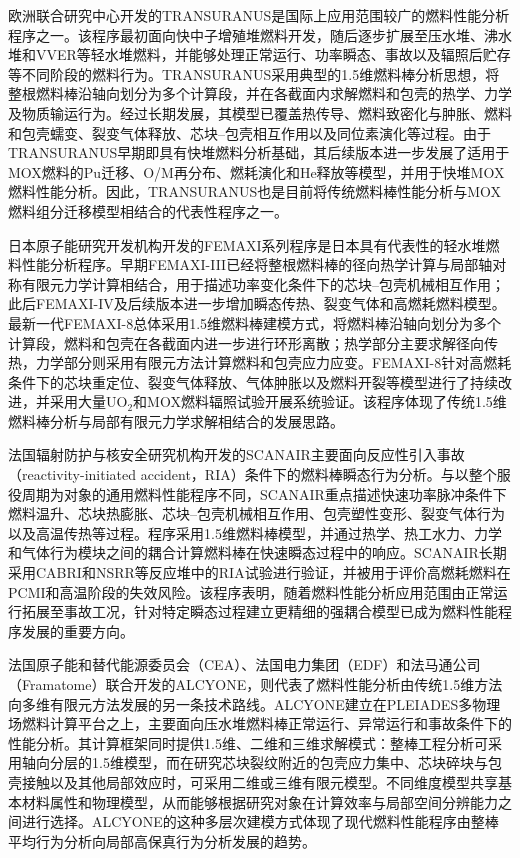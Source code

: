 欧洲联合研究中心开发的TRANSURANUS是国际上应用范围较广的燃料性能分析程序之一。该程序最初面向快中子增殖堆燃料开发，随后逐步扩展至压水堆、沸水堆和VVER等轻水堆燃料，并能够处理正常运行、功率瞬态、事故以及辐照后贮存等不同阶段的燃料行为\cite{lassmannTRANSURANUSFuelRod1992}。TRANSURANUS采用典型的1.5维燃料棒分析思想，将整根燃料棒沿轴向划分为多个计算段，并在各截面内求解燃料和包壳的热学、力学及物质输运行为。经过长期发展，其模型已覆盖热传导、燃料致密化与肿胀、燃料和包壳蠕变、裂变气体释放、芯块--包壳相互作用以及同位素演化等过程。由于TRANSURANUS早期即具有快堆燃料分析基础，其后续版本进一步发展了适用于MOX燃料的Pu迁移、O/M再分布、燃耗演化和He释放等模型，并用于快堆MOX燃料性能分析\cite{dimarcelloExtensionTRANSURANUSPlutonium2012,dimarcelloModellingActinideRedistribution2014}。因此，TRANSURANUS也是目前将传统燃料棒性能分析与MOX燃料组分迁移模型相结合的代表性程序之一。

日本原子能研究开发机构开发的FEMAXI系列程序是日本具有代表性的轻水堆燃料性能分析程序。早期FEMAXI-III已经将整根燃料棒的径向热学计算与局部轴对称有限元力学计算相结合，用于描述功率变化条件下的芯块--包壳机械相互作用；此后FEMAXI-IV及后续版本进一步增加瞬态传热、裂变气体和高燃耗燃料模型。最新一代FEMAXI-8总体采用1.5维燃料棒建模方式，将燃料棒沿轴向划分为多个计算段，燃料和包壳在各截面内进一步进行环形离散；热学部分主要求解径向传热，力学部分则采用有限元方法计算燃料和包壳应力应变\cite{udagawaModelUpdatesFEMAXI2019}。FEMAXI-8针对高燃耗条件下的芯块重定位、裂变气体释放、气体肿胀以及燃料开裂等模型进行了持续改进，并采用大量UO$_2$和MOX燃料辐照试验开展系统验证。该程序体现了传统1.5维燃料棒分析与局部有限元力学求解相结合的发展思路。

法国辐射防护与核安全研究机构开发的SCANAIR主要面向反应性引入事故（re\-ac\-tiv\-i\-ty-initiated accident，RIA）条件下的燃料棒瞬态行为分析。与以整个服役周期为对象的通用燃料性能程序不同，SCANAIR重点描述快速功率脉冲条件下燃料温升、芯块热膨胀、芯块--包壳机械相互作用、包壳塑性变形、裂变气体行为以及高温传热等过程。程序采用1.5维燃料棒模型，并通过热学、热工水力、力学和气体行为模块之间的耦合计算燃料棒在快速瞬态过程中的响应\cite{moalSCANAIRTransientFuel2014}。SCANAIR长期采用CABRI和NSRR等反应堆中的RIA试验进行验证，并被用于评价高燃耗燃料在PCMI和高温阶段的失效风险。该程序表明，随着燃料性能分析应用范围由正常运行拓展至事故工况，针对特定瞬态过程建立更精细的强耦合模型已成为燃料性能程序发展的重要方向。

法国原子能和替代能源委员会（CEA）、法国电力集团（EDF）和法马通公司（Framatome）联合开发的ALCYONE，则代表了燃料性能分析由传统1.5维方法向多维有限元方法发展的另一条技术路线。ALCYONE建立在PLEIADES多物理场燃料计算平台之上，主要面向压水堆燃料棒正常运行、异常运行和事故条件下的性能分析\cite{introiniALCYONEFuelPerformance2024}。其计算框架同时提供1.5维、二维和三维求解模式：整棒工程分析可采用轴向分层的1.5维模型，而在研究芯块裂纹附近的包壳应力集中、芯块碎块与包壳接触以及其他局部效应时，可采用二维或三维有限元模型。不同维度模型共享基本材料属性和物理模型，从而能够根据研究对象在计算效率与局部空间分辨能力之间进行选择。ALCYONE的这种多层次建模方式体现了现代燃料性能程序由整棒平均行为分析向局部高保真行为分析发展的趋势。

